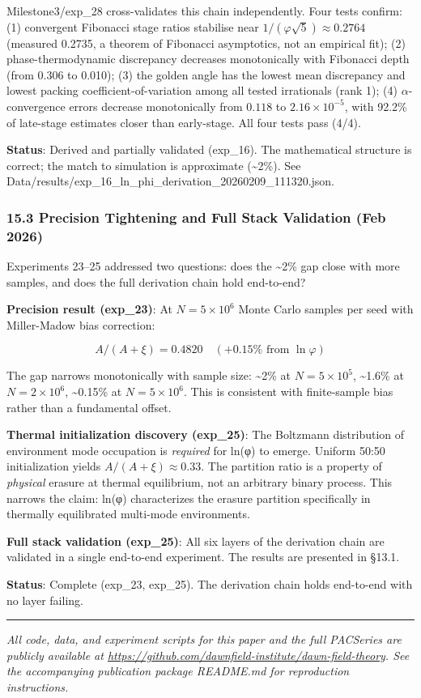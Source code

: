 \documentclass[
  11pt,
  a4paper]{article}
\begin{document}
Milestone3/exp\_28 cross-validates this chain independently. Four tests
confirm: (1) convergent Fibonacci stage ratios stabilise near
\(1/(\varphi\sqrt{5}) \approx 0.2764\) (measured 0.2735, a theorem of
Fibonacci asymptotics, not an empirical fit); (2) phase-thermodynamic
discrepancy decreases monotonically with Fibonacci depth (from 0.306 to
0.010); (3) the golden angle has the lowest mean discrepancy and lowest
packing coefficient-of-variation among all tested irrationals (rank 1);
(4) \(\alpha\)-convergence errors decrease monotonically from \(0.118\)
to \(2.16 \times 10^{-5}\), with 92.2\% of late-stage estimates closer
than early-stage. All four tests pass (4/4).

\textbf{Status}: Derived and partially validated (exp\_16). The
mathematical structure is correct; the match to simulation is
approximate (\textasciitilde2\%). See
Data/results/exp\_16\_ln\_phi\_derivation\_20260209\_111320.json.

\subsubsection{15.3 Precision Tightening and Full Stack Validation (Feb
2026)}\label{precision-tightening-and-full-stack-validation-feb-2026}

Experiments 23--25 addressed two questions: does the \textasciitilde2\%
gap close with more samples, and does the full derivation chain hold
end-to-end?

\textbf{Precision result (exp\_23)}: At \(N = 5 \times 10^6\) Monte
Carlo samples per seed with Miller-Madow bias correction:

\[A/(A+\xi) = 0.4820 \quad (+0.15\% \text{ from } \ln\varphi)\]

The gap narrows monotonically with sample size: \textasciitilde2\% at
\(N = 5 \times 10^5\), \textasciitilde1.6\% at \(N = 2 \times 10^6\),
\textasciitilde0.15\% at \(N = 5 \times 10^6\). This is consistent with
finite-sample bias rather than a fundamental offset.

\textbf{Thermal initialization discovery (exp\_25)}: The Boltzmann
distribution of environment mode occupation is \emph{required} for ln(φ)
to emerge. Uniform 50:50 initialization yields
\(A/(A+\xi) \approx 0.33\). The partition ratio is a property of
\emph{physical} erasure at thermal equilibrium, not an arbitrary binary
process. This narrows the claim: ln(φ) characterizes the erasure
partition specifically in thermally equilibrated multi-mode
environments.

\textbf{Full stack validation (exp\_25)}: All six layers of the
derivation chain are validated in a single end-to-end experiment. The
results are presented in §13.1.

\textbf{Status}: Complete (exp\_23, exp\_25). The derivation chain holds
end-to-end with no layer failing.

\begin{center}\rule{0.5\linewidth}{0.5pt}\end{center}

\emph{All code, data, and experiment scripts for this paper and the full
PACSeries are publicly available at
\url{https://github.com/dawnfield-institute/dawn-field-theory}. See the
accompanying publication package README.md for reproduction
instructions.}
\end{document}
